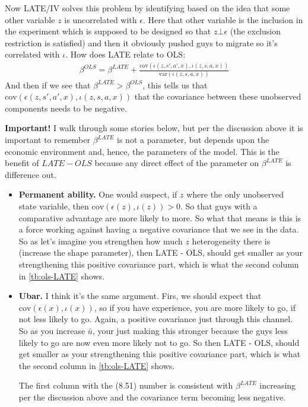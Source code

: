 \documentclass[pdftex,11pt]{article}
\begin{document}
Now LATE/IV solves this problem by identifying based on the idea that some other variable $z$ is uncorrelated with $\epsilon$. Here that other variable is the inclusion in the experiment which is supposed to be designed so that $z \bot  \epsilon$ (the exclusion restriction is satisfied) and then it obviously pushed guys to migrate so it's correlated with $\iota$. How does LATE relate to OLS:
\begin{align}
\beta^{OLS} = \beta^{LATE} + \frac{\mathrm{cov}( \epsilon(z,s',a',x), \iota(z,s,a,x))} {\mathrm{var}(\iota(z,s,a,x))}
\end{align}
And then if we see that $\beta^{LATE} > \beta^{OLS}$, this tells us that $\mathrm{cov}( \epsilon(z,s',a',x), \iota(z,s,a,x))$ that the covariance between these unobserved components needs to be negative.

\textbf{Important!} I walk through some stories below, but per the discussion above it is important to remember $\beta^{LATE}$ is not a parameter, but depends upon the economic environment and, hence, the parameters of the model. This is the benefit of $LATE - OLS$ because any direct effect of the parameter on $\beta^{LATE}$ is difference out.



\begin{itemize}
\item \textbf{Permanent ability.} One would suspect, if $z$ where the only unobserved state variable, then  $\mathrm{cov}( \epsilon(z), \iota(z)) > 0$. So that guys with a comparative advantage are more likely to more. So what that means is this is a force working against having a negative covariance that we see in the data. So as let's imagine you strengthen how much $z$ heterogeneity there is (increase the shape parameter), then LATE - OLS, should get smaller as your strengthening this positive covariance part, which is what the second column in \ref{tb:ols-LATE} shows.

\item \textbf{Ubar.} I think it's the same argument. Firs, we should expect that $\mathrm{cov}( \epsilon(x), \iota(x))$, so if you have experience, you are more likely to go, if not less likely to go. Again, a positive covariance just through this channel. So as you increase $\bar u$, your just making this stronger because the guys less likely to go are now even more likely not to go. So then LATE - OLS, should get smaller as your strengthening this positive covariance part, which is what the second column in \ref{tb:ols-LATE} shows.

    The first column with the (8.51) number is consistent with $\beta^{LATE}$ increasing per the discussion above and the covariance term becoming less negative.

\end{itemize}
\end{document}
